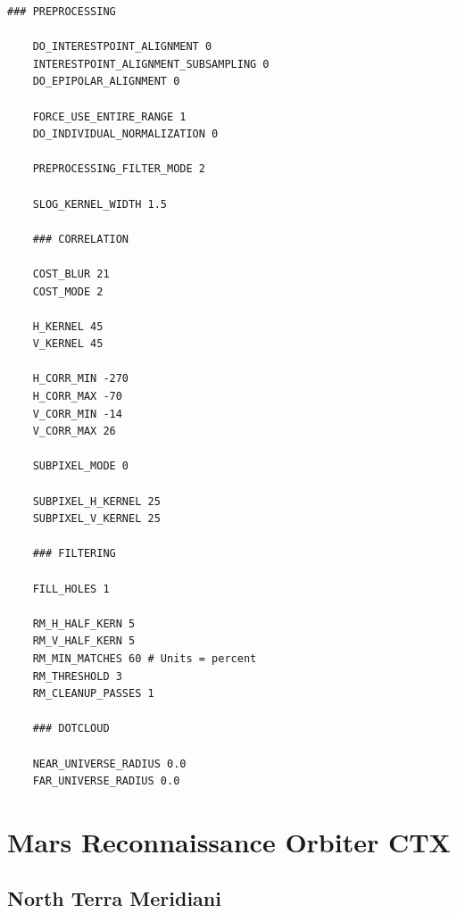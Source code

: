 \begin{center}\begin{minipage}{5.5in}
\begin{Verbatim}[frame=single,fontsize=\small,label=stereo.default for HiRISE North Terra Meridiani Crop]
    ### PREPROCESSING

    DO_INTERESTPOINT_ALIGNMENT 0
    INTERESTPOINT_ALIGNMENT_SUBSAMPLING 0
    DO_EPIPOLAR_ALIGNMENT 0

    FORCE_USE_ENTIRE_RANGE 1
    DO_INDIVIDUAL_NORMALIZATION 0

    PREPROCESSING_FILTER_MODE 2

    SLOG_KERNEL_WIDTH 1.5

    ### CORRELATION

    COST_BLUR 21
    COST_MODE 2

    H_KERNEL 45
    V_KERNEL 45

    H_CORR_MIN -270
    H_CORR_MAX -70
    V_CORR_MIN -14
    V_CORR_MAX 26

    SUBPIXEL_MODE 0

    SUBPIXEL_H_KERNEL 25
    SUBPIXEL_V_KERNEL 25

    ### FILTERING

    FILL_HOLES 1

    RM_H_HALF_KERN 5
    RM_V_HALF_KERN 5
    RM_MIN_MATCHES 60 # Units = percent
    RM_THRESHOLD 3
    RM_CLEANUP_PASSES 1

    ### DOTCLOUD

    NEAR_UNIVERSE_RADIUS 0.0
    FAR_UNIVERSE_RADIUS 0.0
\end{Verbatim}
\end{minipage}\end{center}

\vfill

\section{Mars Reconnaissance Orbiter CTX}

\subsection{North Terra Meridiani}

